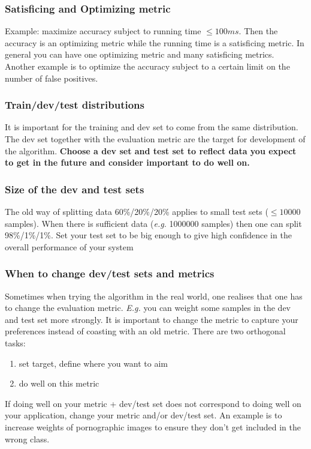 \documentclass{article}
\begin{document}
\subsubsection{Satisficing and Optimizing metric}
Example: maximize accuracy subject to running time $\le 100ms$.
Then the accuracy is an optimizing metric while the running time is a satisficing metric.
In general you can have one optimizing metric and many satisficing metrics.
Another example is to optimize the accuracy subject to a certain limit on the number of false positives.

\subsubsection{Train/dev/test distributions}
It is important for the training and dev set to come from the same distribution.
The dev set together with the evaluation metric are the target for development of the algorithm.
\textbf{Choose a dev set and test set to reflect data you expect to get in the future and consider important to do well on.}

\subsubsection{Size of the dev and test sets}
The old way of splitting data 60\%/20\%/20\% applies to small test sets ($\le 10000$ samples).
When there is sufficient data (\emph{e.g.} 1000000 samples) then one can split 98\%/1\%/1\%.
Set your test set to be big enough to give high confidence in the overall performance of your system

\subsubsection{When to change dev/test sets and metrics}
Sometimes when trying the algorithm in the real world, one realises that one has to change the evaluation metric.
\emph{E.g.} you can weight some samples in the dev and test set more strongly.
It is important to change the metric to capture your preferences instead of coasting with an old metric.
There are two orthogonal tasks:
\begin{enumerate}
  \item set target, define where you want to aim
  \item do well on this metric
\end{enumerate}
If doing well on your metric + dev/test set does not correspond to doing well on your application, change your metric and/or dev/test set.
An example is to increase weights of pornographic images to ensure they don't get included in the wrong class.
\end{document}
